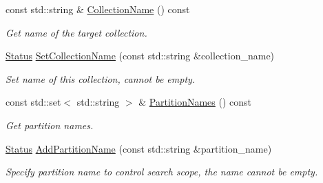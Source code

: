 \begin{DoxyCompactItemize}
\item 
\mbox{\label{classmilvus_1_1_search_arguments_a9128de327c2178bb97cb0f1784a1ae4b}} 
const std\+::string \& \hyperlink{classmilvus_1_1_search_arguments_a9128de327c2178bb97cb0f1784a1ae4b}{Collection\+Name} () const
\begin{DoxyCompactList}\small\item\em Get name of the target collection. \end{DoxyCompactList}\item 
\mbox{\label{classmilvus_1_1_search_arguments_a317118297874569144428031af12e47e}} 
\hyperlink{classmilvus_1_1_status}{Status} \hyperlink{classmilvus_1_1_search_arguments_a317118297874569144428031af12e47e}{Set\+Collection\+Name} (const std\+::string \&collection\+\_\+name)
\begin{DoxyCompactList}\small\item\em Set name of this collection, cannot be empty. \end{DoxyCompactList}\item 
\mbox{\label{classmilvus_1_1_search_arguments_a7880af3cc2d8e678d62db9b619f7a7ba}} 
const std\+::set$<$ std\+::string $>$ \& \hyperlink{classmilvus_1_1_search_arguments_a7880af3cc2d8e678d62db9b619f7a7ba}{Partition\+Names} () const
\begin{DoxyCompactList}\small\item\em Get partition names. \end{DoxyCompactList}\item 
\mbox{\label{classmilvus_1_1_search_arguments_a6bf0e7a699f1c51ed9723c700db73197}} 
\hyperlink{classmilvus_1_1_status}{Status} \hyperlink{classmilvus_1_1_search_arguments_a6bf0e7a699f1c51ed9723c700db73197}{Add\+Partition\+Name} (const std\+::string \&partition\+\_\+name)
\begin{DoxyCompactList}\small\item\em Specify partition name to control search scope, the name cannot be empty. \end{DoxyCompactList}\item 
\mbox{\label{classmilvus_1_1_search_arguments_a7aca68d702f30329d9b2adcbcb03b187}} 

\end{DoxyCompactItemize}

